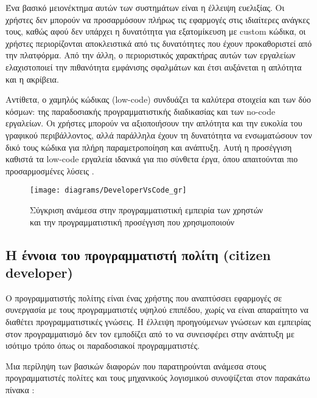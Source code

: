                 Ένα βασικό μειονέκτημα αυτών των συστημάτων είναι η έλλειψη ευελιξίας. Οι χρήστες δεν μπορούν να προσαρμόσουν πλήρως τις εφαρμογές στις ιδιαίτερες ανάγκες τους, καθώς αφού δεν υπάρχει η δυνατότητα για εξατομίκευση με custom κώδικα, οι χρήστες περιορίζονται αποκλειστικά από τις δυνατότητες που έχουν προκαθοριστεί από την πλατφόρμα. Από την άλλη, ο περιοριστικός χαρακτήρας αυτών των εργαλείων ελαχιστοποιεί την πιθανότητα εμφάνισης σφαλμάτων και έτσι αυξάνεται η απλότητα και η ακρίβεια.

                Αντίθετα, ο χαμηλός κώδικας (low-code) συνδυάζει τα καλύτερα στοιχεία και των δύο κόσμων: της παραδοσιακής προγραμματιστικής διαδικασίας και των no-code εργαλείων. Οι χρήστες μπορούν να αξιοποιήσουν την απλότητα και την ευκολία του γραφικού περιβάλλοντος, αλλά παράλληλα έχουν τη δυνατότητα να ενσωματώσουν τον δικό τους κώδικα για πλήρη παραμετροποίηση και ανάπτυξη. Αυτή η προσέγγιση καθιστά τα low-code εργαλεία ιδανικά για πιο σύνθετα έργα, όπου απαιτούνται πιο προσαρμοσμένες λύσεις \cite{LowCodeSimon}.

            \begin{figure}[h!] \noindent \centering
                \texttt{[image: diagrams/DeveloperVsCode\_gr]}
                \caption{\centering Σύγκριση ανάμεσα στην προγραμματιστική εμπειρία των χρηστών \\ και την προγραμματιστική προσέγγιση που χρησιμοποιούν \cite{LowCodeSimon}}
                \label{fig:developer-vs-code}
            \end{figure}

            \subsection{Η έννοια του προγραμματιστή πολίτη (citizen developer)} \label{subsec:citizen-developer}
                Ο προγραμματιστής πολίτης είναι ένας χρήστης που αναπτύσσει εφαρμογές σε συνεργασία με τους προγραμματιστές υψηλού επιπέδου, χωρίς να είναι απαραίτητο να διαθέτει προγραμματιστικές γνώσεις. Η έλλειψη προηγούμενων γνώσεων και εμπειρίας στον προγραμματισμό δεν τον εμποδίζει από το να συνεισφέρει στην ανάπτυξη με ισότιμο τρόπο όπως οι παραδοσιακοί προγραμματιστές.

                Μια περίληψη των βασικών διαφορών που παρατηρούνται ανάμεσα στους προγραμματιστές πολίτες και τους μηχανικούς λογισμικού συνοψίζεται στον παρακάτω πίνακα \cite{LowCodeSimon}:


